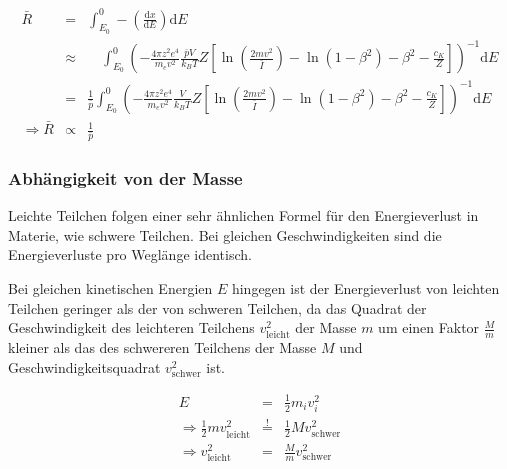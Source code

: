 \documentclass[12pt,a4paper]{scrartcl}
\numberwithin{equation}{section} %
\begin{document}
\begin{eqnarray}
    \bar{R} &=&
        \int_{E_0}^{0} -\left(\frac{\mathrm dx}{\mathrm dE}\right) \mathrm dE \\
        &\approx&
            \quad
            \int_{E_0}^{0}
                \left(
                - \frac{4\pi z^2 e^4}{m_e v^2}
                \frac{\bar pV}{k_BT}
                Z\left[
                    \ln\left(\frac{2mv^2}{\bar I}\right)
                    - \ln\left(1 - \beta^2\right)
                    - \beta^2
                    - \frac{c_K}{Z}
                \right]
            \right)^{-1}
            \mathrm dE \\
        &=&
            \frac{1}{\bar p}
            \int_{E_0}^{0}
                \left(
                - \frac{4\pi z^2 e^4}{m_e v^2}
                \frac{V}{k_BT}
                Z\left[
                    \ln\left(\frac{2mv^2}{\bar I}\right)
                    - \ln\left(1 - \beta^2\right)
                    - \beta^2
                    - \frac{c_K}{Z}
                \right]
            \right)^{-1}
            \mathrm dE \\
    \Rightarrow \bar R &\propto& \frac{1}{\bar p} \label{R(p)}
\end{eqnarray}

\hypertarget{abhuxe4ngigkeit-von-der-masse}{%
\subsubsection{Abhängigkeit von der
Masse}\label{abhuxe4ngigkeit-von-der-masse}}

Leichte Teilchen folgen einer sehr ähnlichen Formel für den Energieverlust in Materie, wie schwere Teilchen. Bei gleichen Geschwindigkeiten sind die Energieverluste pro Weglänge identisch.

Bei gleichen kinetischen Energien $E$ hingegen ist der Energieverlust von leichten Teilchen geringer als der von schweren Teilchen, da das Quadrat der Geschwindigkeit des leichteren Teilchens $v_\mathrm{leicht}^2$ der Masse $m$ um einen Faktor $\frac{M}{m}$ kleiner als das des schwereren Teilchens der Masse $M$ und Geschwindigkeitsquadrat $v_\mathrm{schwer}^2$ ist.

\begin{eqnarray}
    E &=& \frac{1}{2}m_i v_i^2 \\
    \Rightarrow \frac{1}{2} m v_\mathrm{leicht}^2
        &\overset{!}{=}& \frac{1}{2} M v_\mathrm{schwer}^2 \\
    \Rightarrow v_\mathrm{leicht}^2 & = &\frac{M}{m} v_\mathrm{schwer}^2
\end{eqnarray}
\end{document}
